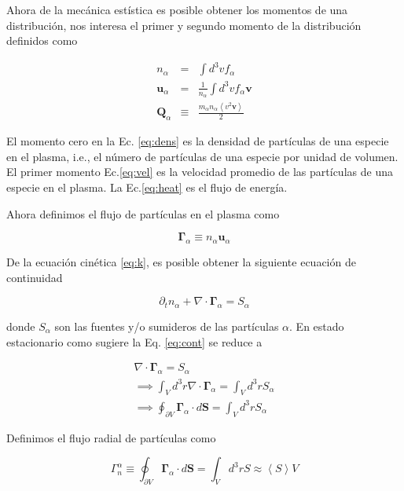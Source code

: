 \documentclass[11pt]{article}
\theoremstyle{definition}
\begin{document}
  Ahora de la mec\'anica est\'istica es posible obtener los momentos de una distribuci\'on, nos interesa el primer y segundo momento\cite{helander2005} de la distribuci\'on definidos como 

  \begin{eqnarray}
    n_\alpha &=& \int d^3v f_\alpha \label{eq:dens}\\
    \textbf{u}_{\alpha} &=& \frac{1}{n_\alpha}\int d^3v f_\alpha\textbf{v} \label{eq:vel} \\
    \textbf{Q}_\alpha &\equiv& \frac{m_\alpha n_\alpha \left<v^2\textbf{v}\right>}{2}
  \end{eqnarray}

El momento cero en la Ec. \eqref{eq:dens} es la densidad de part\'iculas de una especie en el plasma, i.e., el n\'umero de part\'iculas de una especie por unidad de volumen. El primer momento Ec.\eqref{eq:vel} es la velocidad promedio de las part\'iculas de una especie en el plasma. La Ec.\eqref{eq:heat} es el flujo de energ\'ia. 

  Ahora definimos el flujo de part\'iculas en el plasma como 
  
  \begin{equation}
    \pmb{\Gamma}_\alpha \equiv n_\alpha\textbf{u}_\alpha
  \end{equation}

  De la ecuaci\'on cin\'etica \eqref{eq:k}, es posible obtener la siguiente ecuaci\'on de continuidad

  \begin{equation}\label{eq:cont}
    \partial_t n_\alpha + \nabla\cdot\pmb{\Gamma}_\alpha = S_\alpha
  \end{equation}

  donde $S_\alpha$ son las fuentes y/o sumideros de las part\'iculas $\alpha$. En estado estacionario como sugiere \cite{lechte2002} la Eq. \eqref{eq:cont} se reduce a 

  \begin{eqnarray*}
    \nabla\cdot\pmb{\Gamma}_\alpha = S_\alpha \\
    \implies \int_V d^3r\nabla\cdot\pmb{\Gamma}_\alpha = \int_V d^3r S_\alpha\\
    \implies \oint_{\partial V} \pmb{\Gamma}_\alpha\cdot d\textbf{S} = \int_V d^3r S_\alpha
  \end{eqnarray*}

  Definimos el flujo radial de part\'iculas como

  \begin{equation}\label{eq:rtpf}
    \Gamma_n^\alpha \equiv \oint_{\partial V} \pmb{\Gamma}_\alpha \cdot d\textbf{S} = \int_V d^3r S \approx \left<S\right>V
  \end{equation}
\end{document}
